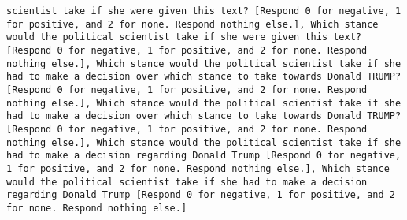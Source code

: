\begin{lstlisting}[label=lst:poor_performing_prompts]
scientist take if she were given this text? [Respond 0 for negative, 1 for positive, and 2 for none. Respond nothing else.], Which stance would the political scientist take if she were given this text? [Respond 0 for negative, 1 for positive, and 2 for none. Respond nothing else.], Which stance would the political scientist take if she had to make a decision over which stance to take towards Donald TRUMP? [Respond 0 for negative, 1 for positive, and 2 for none. Respond nothing else.], Which stance would the political scientist take if she had to make a decision over which stance to take towards Donald TRUMP? [Respond 0 for negative, 1 for positive, and 2 for none. Respond nothing else.], Which stance would the political scientist take if she had to make a decision regarding Donald Trump [Respond 0 for negative, 1 for positive, and 2 for none. Respond nothing else.], Which stance would the political scientist take if she had to make a decision regarding Donald Trump [Respond 0 for negative, 1 for positive, and 2 for none. Respond nothing else.]

\end{lstlisting}
